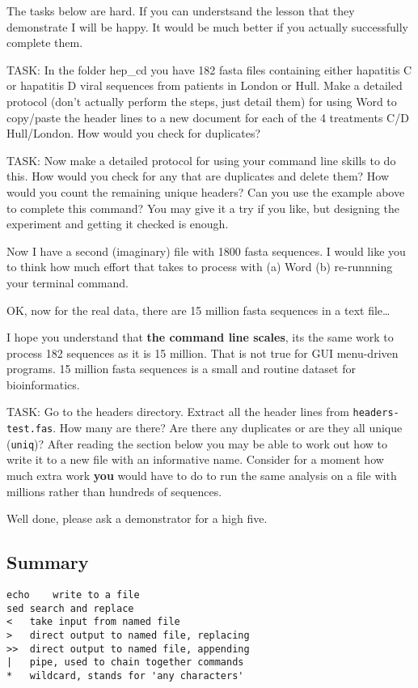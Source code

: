 \documentclass[11pt]{article}
\begin{document}
The tasks below are hard. If you can understsand the lesson that they
demonstrate I will be happy. It would be much better if you actually
successfully complete them.

TASK: In the folder hep\_cd you have 182 fasta files containing either
hapatitis C or hapatitis D viral sequences from patients in London or
Hull. Make a detailed protocol (don't actually perform the steps, just
detail them) for using Word to copy/paste the header lines to a new
document for each of the 4 treatments C/D Hull/London. How would you
check for duplicates?

TASK: Now make a detailed protocol for using your command line skills to
do this. How would you check for any that are duplicates and delete
them? How would you count the remaining unique headers? Can you use the
example above to complete this command? You may give it a try if you
like, but designing the experiment and getting it checked is enough.

Now I have a second (imaginary) file with 1800 fasta sequences. I would
like you to think how much effort that takes to process with (a) Word
(b) re-runnning your terminal command.

OK, now for the real data, there are 15 million fasta sequences in a
text file\ldots{}

I hope you understand that \textbf{the command line scales}, its the
same work to process 182 sequences as it is 15 million. That is not true
for GUI menu-driven programs. 15 million fasta sequences is a small and
routine dataset for bioinformatics.

TASK: Go to the headers directory. Extract all the header lines from
\texttt{headers-test.fas}. How many are there? Are there any duplicates
or are they all unique (\texttt{uniq})? After reading the section below
you may be able to work out how to write it to a new file with an
informative name. Consider for a moment how much extra work \textbf{you}
would have to do to run the same analysis on a file with millions rather
than hundreds of sequences.

Well done, please ask a demonstrator for a high five.

    \hypertarget{summary}{%
\subsection{Summary}\label{summary}}

\begin{verbatim}
echo    write to a file
sed search and replace
<   take input from named file
>   direct output to named file, replacing
>>  direct output to named file, appending
|   pipe, used to chain together commands
*   wildcard, stands for 'any characters'
\end{verbatim}
\end{document}

